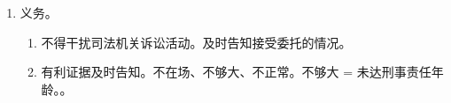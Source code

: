 \begin{enumerate}
\begin{enumerate}
\begin{enumerate}
\begin{enumerate}
                          \item 主动听。批捕未成年，审查起诉中，二审不开庭，死刑上抗案，认罪又认罚。
                        \end{enumerate}
                  \item 阅卷。
                        \begin{itemize}
                          \item 阅、卷都要扩大解释。阅 \yjt 复印拷贝。卷 \yjt 案件材料、证据、起诉意见书等。
                          \item 审查起诉后、地点为检察院或者法院、律师不收费。。
                          \item 发现有利证据没有提交，可以向检察院申请调取。
                        \end{itemize}
                  \item 取证。
                  \item 知情权。重要的诉讼节点都要告知 And(嫌疑人，辩护律师)。。
                  \item 参加法庭调查、辩论。。
                  \item 人身保障。
                  \item {} \yjt 不是传声筒。。。
                  \item 非律。非律会见要许可、非律阅卷要许可、非律没有取证权。
                  \item 律师。
                        \begin{enumerate}
                          \item 律师会见凭 3 证。律师一般不用批，危恐除外要许可。适用于所有会见场景。
                          \item 律师阅卷不用批，均自审查起诉起。
                          \item 律师取证需同意。控方证人双重许，若有困难找法检。
                        \end{enumerate}
                \end{enumerate}
          \item 义务。
                \begin{enumerate}
                  \item 不得干扰司法机关诉讼活动。及时告知接受委托的情况。
                  \item 有利证据及时告知。不在场、不够大、不正常。不够大 = 未达刑事责任年龄。。

\end{enumerate}
\end{enumerate}
\end{enumerate}
